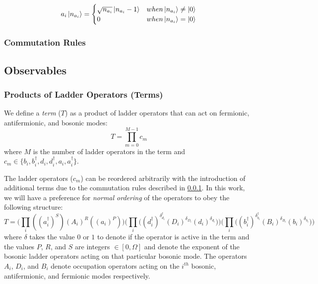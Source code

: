 \begin{equation}
    \label{eq:bosonic-annihilation}
    a_i \ket{n_{a_i}} = 
    \begin{cases} 
        \sqrt{n_{a_i}} \ket{n_{a_i} - 1}  & when \ket{n_{a_i}} \neq \ket{0} \\
        0 & when \ket{n_{a_i}} = \ket{0}
    \end{cases}
\end{equation}

\subsubsection{Commutation Rules}
\label{subsec:commutation}


\subsection{Observables}
\label{subsec:observables}

\subsubsection{Products of Ladder Operators (Terms)}

We define a \textit{term} ($T$) as a product of ladder operators that can act on fermionic, antifermionic, and bosonic modes:
\begin{equation}
    T = \prod_{m=0}^{M-1} c_m
\end{equation}
where $M$ is the number of ladder operators in the term and $c_m \in \{b_i, b_i^\dagger, d_i, d_i^\dagger, a_i, a_i^\dagger\}$.

The ladder operators ($c_m$) can be reordered arbitrarily with the introduction of additional terms due to the commutation rules described in \ref{subsec:commutation}.
In this work, we will have a preference for \textit{normal ordering} of the operators to obey the following structure:
\begin{equation}
    T = \Big( \prod_i ((a_i^\dagger)^S)(A_i)^R((a_i)^P) \Big) \Big( \prod_i \big( (d_i^\dagger)^{\delta_{d_i}^{\dagger}} (D_i)^{\delta_{D_i}} (d_i)^{\delta_{d_i}} \big) \Big) \Big( \prod_i \big( (b_i^\dagger)^{\delta_{b_i}^{\dagger}} (B_i)^{\delta_{B_i}} (b_i)^{\delta_{b_i}} \big) \Big) 
\end{equation}
where $\delta$ takes the value $0$ or $1$ to denote if the operator is active in the term and the values $P$, $R$, and $S$ are integers $\in [0, \Omega]$ and denote the exponent of the bosonic ladder operators acting on that particular bosonic mode.
The operators $A_i$, $D_i$, and $B_i$ denote occupation operators acting on the $i^{th}$ bosonic, antifermionic, and fermionic modes respectively.

